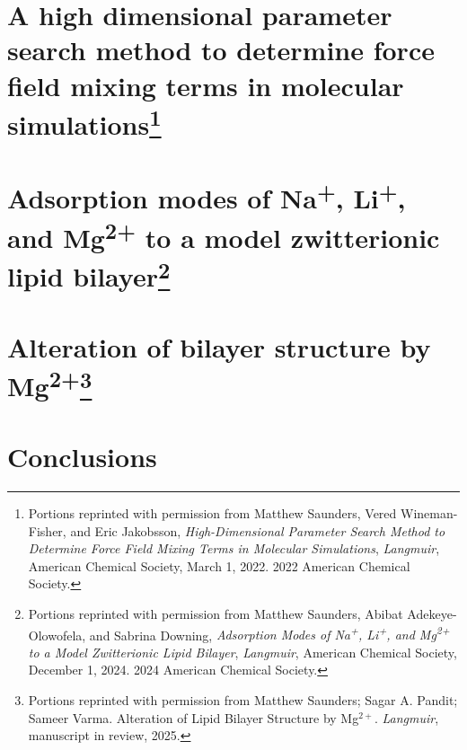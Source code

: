 \documentclass[12pt,openany,final]{book}
\newcommand{\na}{Na\textsuperscript{+}}
\newcommand{\li}{Li\textsuperscript{+}}
\newcommand{\mg}{Mg\textsuperscript{2+}}
\begin{document}
\chapter[A high dimensional parameter search method to...]{A high dimensional parameter search method to determine force field mixing terms in molecular simulations\footnote{
Portions reprinted with permission from Matthew Saunders, Vered Wineman-Fisher, and Eric Jakobsson, \textit{High-Dimensional Parameter Search Method to Determine Force Field Mixing Terms in Molecular Simulations}, 
\textit{Langmuir}, American Chemical Society, March 1, 2022. 
\textcopyright{} 2022 American Chemical Society.
}}
\graphicspath{{CH2/figures/}}

\chapter[Adsorption modes of \na{}, \li{}, and \mg{} to a model zwitterionic lipid bilayer]{Adsorption modes of \na{}, \li{}, and \mg{} to a model zwitterionic lipid bilayer\footnote{
    Portions reprinted with permission from Matthew Saunders, Abibat Adekeye-Olowofela, and Sabrina Downing, \textit{Adsorption Modes of Na\textsuperscript{+}, Li\textsuperscript{+}, and Mg\textsuperscript{2+} to a Model Zwitterionic Lipid Bilayer}, 
\textit{Langmuir}, American Chemical Society, December 1, 2024. 
\textcopyright{} 2024 American Chemical Society.
}}
\graphicspath{{CH3/figures/}}

\chapter[Alteration of bilayer structure by \mg{}]{Alteration of bilayer structure by \mg{}\footnote{Portions reprinted with permission from Matthew Saunders; Sagar A. Pandit; Sameer Varma.
Alteration of Lipid Bilayer Structure by Mg$^{2+}$.
\textit{Langmuir}, manuscript in review, 2025.}}
\graphicspath{{CH4/figures/}}

\chapter{Conclusions}
\graphicspath{{CH5/figures/}}


\end{document}
